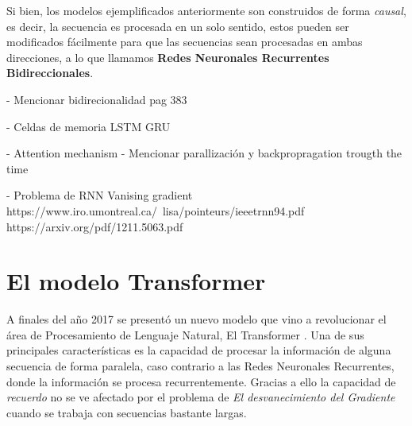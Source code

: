 Si bien, los modelos ejemplificados anteriormente son construidos de forma \textit{causal}, es
decir, la secuencia es procesada en un solo sentido, estos pueden ser modificados fácilmente para
que las secuencias sean procesadas en ambas direcciones, a lo que llamamos \textbf{Redes Neuronales
Recurrentes Bidireccionales}.

- Mencionar bidirecionalidad pag 383

- Celdas de memoria LSTM GRU

- Attention mechanism
- Mencionar parallización y backpropragation trougth the time

- Problema de RNN
Vanising gradient
https://www.iro.umontreal.ca/~lisa/pointeurs/ieeetrnn94.pdf
https://arxiv.org/pdf/1211.5063.pdf





\section{El modelo Transformer}

A finales del año 2017 se presentó un nuevo modelo que vino a revolucionar el área de Procesamiento
de Lenguaje Natural, El Transformer \cite{Vaswani}. Una de sus principales características es la
capacidad de procesar la información de alguna secuencia de forma paralela, caso contrario a las
Redes Neuronales Recurrentes, donde la información se procesa recurrentemente. Gracias a ello
la capacidad de \textit{recuerdo} no se ve afectado por el problema de \textit{El
desvanecimiento del Gradiente} cuando se trabaja con secuencias bastante largas.
